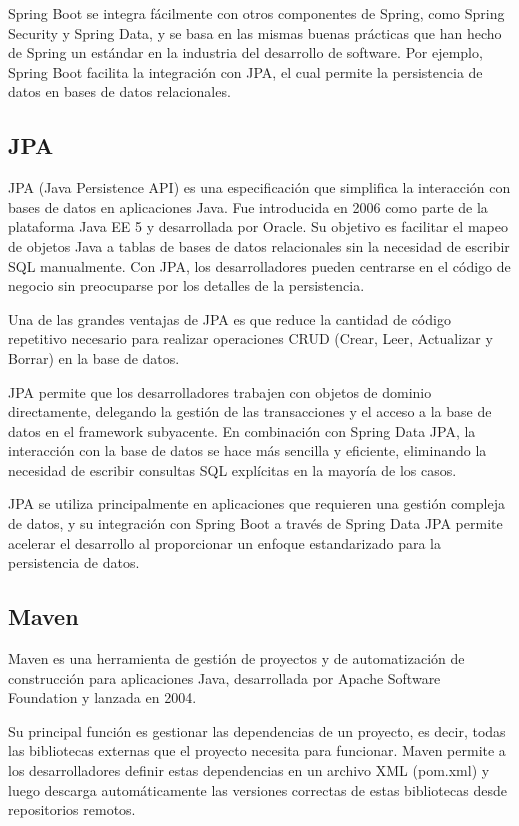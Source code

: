 \documentclass[draft]{scrbook}
\begin{document}
Spring Boot se integra fácilmente con otros componentes de Spring, como Spring Security y Spring Data, y se basa en las mismas buenas prácticas que han hecho de Spring un estándar en la industria del desarrollo de software. Por ejemplo, Spring Boot facilita la integración con JPA, el cual permite la persistencia de datos en bases de datos relacionales.

\subsection{ JPA }

JPA (Java Persistence API) es una especificación que simplifica la interacción con bases de datos en aplicaciones Java. Fue introducida en 2006 como parte de la plataforma Java EE 5 y desarrollada por Oracle. Su objetivo es facilitar el mapeo de objetos Java a tablas de bases de datos relacionales sin la necesidad de escribir SQL manualmente. Con JPA, los desarrolladores pueden centrarse en el código de negocio sin preocuparse por los detalles de la persistencia.

Una de las grandes ventajas de JPA es que reduce la cantidad de código repetitivo necesario para realizar operaciones CRUD (Crear, Leer, Actualizar y Borrar) en la base de datos. 

JPA permite que los desarrolladores trabajen con objetos de dominio directamente, delegando la gestión de las transacciones y el acceso a la base de datos en el framework subyacente. En combinación con Spring Data JPA, la interacción con la base de datos se hace más sencilla y eficiente, eliminando la necesidad de escribir consultas SQL explícitas en la mayoría de los casos.

JPA se utiliza principalmente en aplicaciones que requieren una gestión compleja de datos, y su integración con Spring Boot a través de Spring Data JPA permite acelerar el desarrollo al proporcionar un enfoque estandarizado para la persistencia de datos.



\subsection{ Maven }

Maven es una herramienta de gestión de proyectos y de automatización de construcción para aplicaciones Java, desarrollada por Apache Software Foundation y lanzada en 2004. 

Su principal función es gestionar las dependencias de un proyecto, es decir, todas las bibliotecas externas que el proyecto necesita para funcionar. Maven permite a los desarrolladores definir estas dependencias en un archivo XML (pom.xml) y luego descarga automáticamente las versiones correctas de estas bibliotecas desde repositorios remotos.
\end{document}
